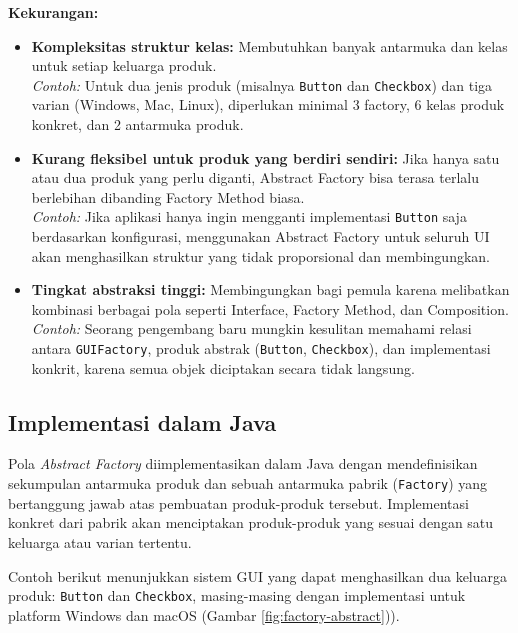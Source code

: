 \textbf{Kekurangan:}
\begin{itemize}
	\item \textbf{Kompleksitas struktur kelas:} Membutuhkan banyak antarmuka dan kelas untuk setiap keluarga produk. \\
	\textit{Contoh:} Untuk dua jenis produk (misalnya \texttt{Button} dan \texttt{Checkbox}) dan tiga varian (Windows, Mac, Linux), diperlukan minimal 3 factory, 6 kelas produk konkret, dan 2 antarmuka produk.
	
	\item \textbf{Kurang fleksibel untuk produk yang berdiri sendiri:} Jika hanya satu atau dua produk yang perlu diganti, Abstract Factory bisa terasa terlalu berlebihan dibanding Factory Method biasa. \\
	\textit{Contoh:} Jika aplikasi hanya ingin mengganti implementasi \texttt{Button} saja berdasarkan konfigurasi, menggunakan Abstract Factory untuk seluruh UI akan menghasilkan struktur yang tidak proporsional dan membingungkan.
	
	\item \textbf{Tingkat abstraksi tinggi:} Membingungkan bagi pemula karena melibatkan kombinasi berbagai pola seperti Interface, Factory Method, dan Composition. \\
	\textit{Contoh:} Seorang pengembang baru mungkin kesulitan memahami relasi antara \texttt{GUIFactory}, produk abstrak (\texttt{Button}, \texttt{Checkbox}), dan implementasi konkrit, karena semua objek diciptakan secara tidak langsung.
\end{itemize}


\subsection{Implementasi dalam Java}

Pola \textit{Abstract Factory} diimplementasikan dalam Java dengan mendefinisikan sekumpulan antarmuka produk dan sebuah antarmuka pabrik (\texttt{Factory}) yang bertanggung jawab atas pembuatan produk-produk tersebut. Implementasi konkret dari pabrik akan menciptakan produk-produk yang sesuai dengan satu keluarga atau varian tertentu.

Contoh berikut menunjukkan sistem GUI yang dapat menghasilkan dua keluarga produk: \texttt{Button} dan \texttt{Checkbox}, masing-masing dengan implementasi untuk platform Windows dan macOS (Gambar \ref{fig:factory-abstract})).

